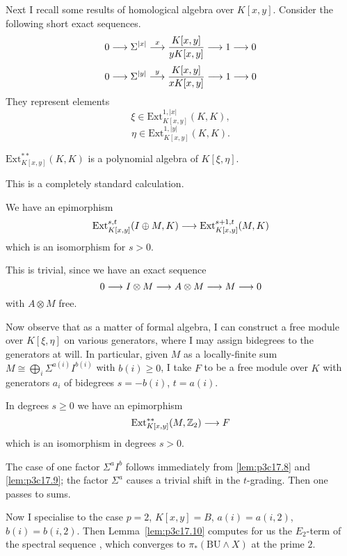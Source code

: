 \documentclass[../main]{subfiles}
\begin{document}
Next I recall some results of homological algebra over $K[x, y]$. Consider the following short exact sequences. $$0 \overset{}{\longrightarrow} \Sigma^{|x|} \overset{x}{\longrightarrow} \frac {K[x, y]} {y K[x, y]} \overset{}{\longrightarrow} 1 \overset{}{\longrightarrow} 0$$ $$0 \overset{}{\longrightarrow} \Sigma^{|y|} \overset{y}{\longrightarrow} \frac {K[x, y]} {x K[x, y]} \overset{}{\longrightarrow} 1 \overset{}{\longrightarrow} 0$$ They represent elements $$\xi \in \mathrm{Ext}_{K[x, y]}^{1, |x|} (K, K),$$ $$\eta \in \mathrm{Ext}_{K[x, y]}^{1, |y|} (K, K).$$

\begin{lemma}
\label{lem:p3c17.8}
$\mathrm{Ext}_{K[x, y]}^{\ast \ast}(K, K)$ is a polynomial algebra of $K[\xi, \eta]$.
\end{lemma}

This is a completely standard calculation.

\begin{lemma}
\label{lem:p3c17.9}
We have an epimorphism $$\mathrm{Ext}_{K[x, y]}^{s, t} (I \oplus M, K) \overset{}{\longrightarrow} \mathrm{Ext}_{K[x, y]}^{s + 1, t}(M, K)$$ which is an isomorphism for $s > 0$. 
\end{lemma}

This is trivial, since we have an exact sequence $$0 \overset{}{\longrightarrow} I \otimes M \overset{}{\longrightarrow} A \otimes M \overset{}{\longrightarrow} M \overset{}{\longrightarrow} 0$$ with $A \otimes M$ free.

Now observe that as a matter of formal algebra, I can construct a free module over $K[\xi, \eta]$ on various generators, where I may assign bidegrees to the generators at will. In particular, given $M$ as a locally-finite sum $M \cong \bigoplus_i \Sigma^{a(i)} I^{b(i)}$ with $b(i) \ge 0$, I take $F$ to be a free module over $K$ with generators $a_i$ of bidegrees $s = -b(i)$, $t = a(i)$.

\begin{lemma}
\label{lem:p3c17.10}
In degrees $s \ge 0$ we have an epimorphism $$\mathrm{Ext}_{K[x, y]}^{\ast \ast}(M, \mathbb{Z}_2) \overset{}{\longrightarrow} F$$ which is an isomorphism in degrees $s > 0$. 
\end{lemma}

The case of one factor $\Sigma^a I^b$ follows immediately from \ref{lem:p3c17.8} and \ref{lem:p3c17.9}; the factor $\Sigma^a$ causes a trivial shift in the $t$-grading. Then one passes to sums.

Now I specialise to the case $p = 2$, $K[x, y] = B$, $a(i) = a(i, 2)$, $b(i) = b(i, 2)$. Then Lemma~\ref{lem:p3c17.10} computes for us the $E_2$-term of the spectral sequence , which converges to $\pi_\ast(\mathrm{BU} \wedge X)$ at the prime $2$. 
\end{document}
